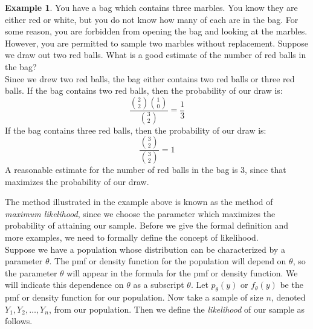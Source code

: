 \documentclass[12pt]{article}
\theoremstyle{definition}
\newtheorem*{example}{Example}
\theoremstyle{remark}
\begin{document}
\begin{example}You have a bag which contains three marbles. You know they are either red or white, but you do not know how many of each are in the bag. For some reason, you are forbidden from opening the bag and looking at the marbles. However, you are permitted to sample two marbles without replacement. Suppose we draw out two red balls. What is a good estimate of the number of red balls in the bag?\\

Since we drew two red balls, the bag either contains two red balls or three red balls. If the bag contains two red balls, then the probability of our draw is:
\[
\dfrac{\binom{2}{2}\binom{1}{0}}{\binom{3}{2}} = \frac{1}{3}
\]
If the bag contains three red balls, then the probability of our draw is:
\[
\dfrac{\binom{3}{2}}{\binom{3}{2}} = 1
\]
A reasonable estimate for the number of red balls in the bag is 3, since that maximizes the probability of our draw.
\end{example}
The method illustrated in the example above is known as the method of \emph{maximum likelihood}, since we choose the parameter which maximizes the probability of attaining our sample. Before we give the formal definition and more examples, we need to formally define the concept of likelihood.\\

Suppose we have a population whose distribution can be characterized by a parameter $\theta$. The pmf or density function for the population will depend on $\theta$, so the parameter $\theta$ will appear in the formula for the pmf or density function. We will indicate this dependence on $\theta$ as a subscript $\theta$. Let $p_\theta(y)$ or $f_\theta(y)$ be the pmf or density function for our population. Now take a sample of size $n$, denoted $Y_1, Y_2, \dots, Y_n$, from our population. Then we define the \emph{likelihood} of our sample as follows.
\end{document}
